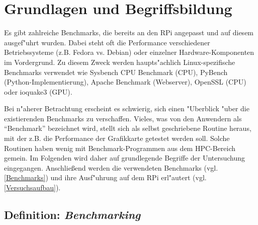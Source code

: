 \chapter{Grundlagen und Begriffsbildung}\label{Kap2}

Es gibt zahlreiche Benchmarks, die bereits an den RPi angepasst und auf diesem ausgef"uhrt wurden. Dabei steht oft die Performance verschiedener Betriebssysteme (z.B. Fedora vs. Debian) oder einzelner Hardware-Komponen\-ten im Vordergrund. Zu diesem Zweck werden haupts"achlich Linux-spezifische Benchmarks verwendet wie Sysbench CPU Benchmark (CPU), PyBench (Python-Implementierung), Apache Benchmark (Webserver), Open\-SSL (CPU) oder ioquake3 (GPU). 

Bei n"aherer Betrachtung erscheint es schwierig, sich einen "Uberblick "uber die existierenden Benchmarks zu verschaffen. Vieles, was von den Anwendern als "`Benchmark"' bezeichnet wird, stellt sich als selbst geschriebene Routine heraus, mit der z.B. die Performance der Grafikkarte getestet werden soll. Solche Routinen haben wenig mit Benchmark-Programmen aus dem HPC-Bereich gemein. Im Folgenden wird daher auf grundlegende Begriffe der Untersuchung eingegangen. Anschlie\ss end werden die verwendeten Benchmarks (vgl. \ref{Benchmarks}) und ihre Ausf"uhrung auf dem RPi erl"autert (vgl. \ref{Versuchsaufbau}). 

\section{Definition: \textit{Benchmarking}}\label{Benchmarking}


